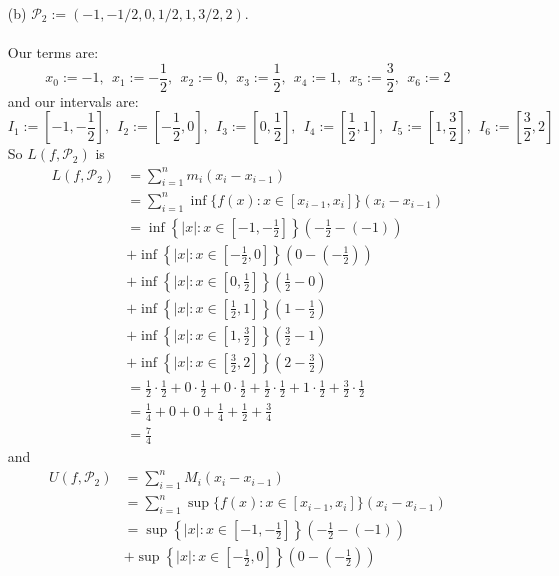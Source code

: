 \documentclass[12pt,letterpaper]{article}
\theoremstyle{case}
\theoremstyle{definition}
\begin{document}
\begin{enumerate}
\begin{enumerate}
\begin{enumerate}
				\item[(b)] $\mathcal{P}_2 := (-1,-1/2,0,1/2,1,3/2,2)$.
				\\\\Our terms are:
				\[x_0:=-1,\ \ x_1:=-\frac{1}{2},\ \ x_2:=0,\ \ x_3:=\frac{1}{2},\ \ x_4:= 1,\ \ x_5:=\frac{3}{2},\ \ x_6:=2\]
				and our intervals are:
				\[I_1:=\left[-1,-\frac{1}{2}\right],\ \ I_2:=\left[-\frac{1}{2},0\right],\ \ I_3:=\left[0,\frac{1}{2}\right],\ \ I_4:=\left[\frac{1}{2},1\right],\ \ I_5:=\left[1,\frac{3}{2}\right],\ \ I_6:=\left[\frac{3}{2}, 2\right]\]
				So $L(f,\mathcal{P}_2)$ is
				\begin{align*}
					L(f,\mathcal{P}_2) &= \sum_{i=1}^{n} m_i(x_i-x_{i-1}) \\
					&= \sum_{i=1}^{n} \inf \{f(x): x \in [x_{i-1}, x_i]\}(x_i-x_{i-1}) \\
					&= \inf\left\{|x|: x \in \left[-1,-\frac{1}{2}\right]\right\}\left(-\frac{1}{2}-(-1)\right) \\
					&+ \inf\left\{|x|: x \in \left[-\frac{1}{2}, 0\right]\right\} \left(0-\left(-\frac{1}{2}\right)\right) \\
					&+ \inf\left\{|x|: x \in \left[0,\frac{1}{2}\right]\right\}\left(\frac{1}{2}-0\right) \\
					&+ \inf \left\{|x|: x \in \left[\frac{1}{2}, 1\right]\right\}\left(1-\frac{1}{2}\right) \\
					&+ \inf\left\{|x|: x \in \left[1,\frac{3}{2}\right]\right\}\left(\frac{3}{2}-1\right) \\
					&+ \inf \left\{|x|: x \in \left[\frac{3}{2}, 2\right]\right\}\left(2 - \frac{3}{2}\right) \\
					&= \frac{1}{2} \cdot \frac{1}{2} + 0 \cdot \frac{1}{2} + 0 \cdot \frac{1}{2} + \frac{1}{2} \cdot \frac{1}{2} + 1 \cdot \frac{1}{2} + \frac{3}{2} \cdot \frac{1}{2} \\
					&=\frac{1}{4} + 0 + 0+ \frac{1}{4} + \frac{1}{2} + \frac{3}{4} \\
					&= \frac{7}{4}
				\end{align*}
				and
				\begin{align*}
					U(f,\mathcal{P}_2) &= \sum_{i=1}^{n} M_i(x_i-x_{i-1}) \\
					&= \sum_{i=1}^{n} \sup \{f(x): x \in [x_{i-1},x_i]\}(x_i-x_{i-1}) \\
					&= \sup \left\{|x|: x \in \left[-1,-\frac{1}{2}\right]\right\}\left(-\frac{1}{2}-(-1)\right) \\
					&+ \sup\left\{|x|: x \in \left[-\frac{1}{2},0\right]\right\}\left(0-\left(-\frac{1}{2}\right)\right) \\

\end{align*}
\end{enumerate}
\end{enumerate}
\end{enumerate}
\end{document}
